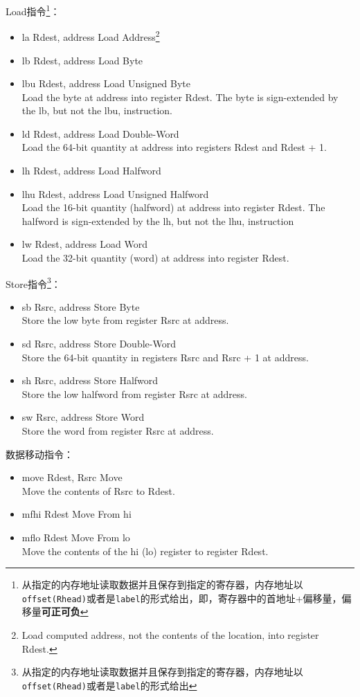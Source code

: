 \documentclass[a4paper, 11pt]{article}
\begin{document}
	Load指令\footnote{从指定的内存地址读取数据并且保存到指定的寄存器，内存地址以\texttt{offset(Rhead)}或者是\texttt{label}的形式给出，即，寄存器中的首地址+偏移量，偏移量\textbf{可正可负}}：
	\begin{itemize}
		\item la Rdest, address	\hfill Load Address\footnote{Load computed address, not the contents of the location, into register Rdest.}
		\item lb Rdest, address	\hfill Load Byte
		\item lbu Rdest, address	\hfill Load Unsigned Byte \\
			Load the byte at address into register Rdest. The byte is sign-extended by the lb, but not the lbu, instruction.
		\item ld Rdest, address	\hfill Load Double-Word \\
			Load the 64-bit quantity at address into registers Rdest and Rdest + 1.
		\item lh Rdest, address	\hfill Load Halfword
		\item lhu Rdest, address	\hfill Load Unsigned Halfword \\
			Load the 16-bit quantity (halfword) at address into register Rdest. The halfword is sign-extended by the lh, but not the lhu, instruction
		\item lw Rdest, address	\hfill Load Word \\
		Load the 32-bit quantity (word) at address into register Rdest.
	\end{itemize}
	Store指令\footnote{从指定的内存地址读取数据并且保存到指定的寄存器，内存地址以\texttt{offset(Rhead)}或者是\texttt{label}的形式给出}：
	\begin{itemize}
		\item sb Rsrc, address	\hfill Store Byte \\
			Store the low byte from register Rsrc at address.
		\item sd Rsrc, address	\hfill Store Double-Word \\
			Store the 64-bit quantity in registers Rsrc and Rsrc + 1 at address.
		\item sh Rsrc, address	\hfill Store Halfword \\
			Store the low halfword from register Rsrc at address.
		\item sw Rsrc, address	\hfill Store Word \\
			Store the word from register Rsrc at address.
	\end{itemize}
	数据移动指令：
	\begin{itemize}
		\item move Rdest, Rsrc	\hfill Move \\
			Move the contents of Rsrc to Rdest.
		\item mfhi Rdest	\hfill Move From hi 
		\item mflo Rdest	\hfill Move From lo \\
		Move the contents of the hi (lo) register to register Rdest.
	\end{itemize}
\end{document}
